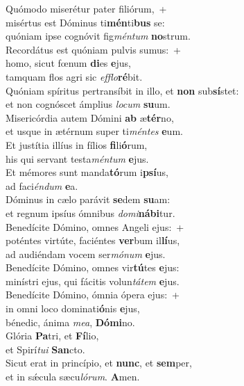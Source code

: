 \oddverse Quómodo miserétur pater filiórum,~+\\
\oddverse  misértus est Dóminus ti\textbf{mén}ti\textbf{bus} se:~\*\\
\oddverse quóniam ipse cognóvit fig\textit{mén}\textit{tum} \textbf{no}strum.\\
\evenverse Recordátus est quóniam pulvis sumus:~+\\
\evenverse  homo, sicut fœnum \textbf{di}es \textbf{e}jus,~\*\\
\evenverse tamquam flos agri sic \textit{ef}\textit{flo}\textbf{ré}bit.\\
\oddverse Quóniam spíritus pertransíbit in illo, et \textbf{non} sub\textbf{sí}stet:~\*\\
\oddverse et non cognóscet ámplius \textit{lo}\textit{cum} \textbf{su}um.\\
\evenverse Misericórdia autem Dómini \textbf{ab} æ\textbf{tér}no,~\*\\
\evenverse et usque in ætérnum super ti\textit{mén}\textit{tes} \textbf{e}um.\\
\oddverse Et justítia illíus in fílios \textbf{fi}li\textbf{ó}rum,~\*\\
\oddverse his qui servant testa\textit{mén}\textit{tum} \textbf{e}jus.\\
\evenverse Et mémores sunt manda\textbf{tó}rum i\textbf{psí}us,~\*\\
\evenverse ad faci\textit{én}\textit{dum} \textbf{e}a.\\
\oddverse Dóminus in cælo parávit \textbf{se}dem \textbf{su}am:~\*\\
\oddverse et regnum ipsíus ómnibus \textit{do}\textit{mi}\textbf{ná}\textbf{bi}tur.\\
\evenverse Benedícite Dómino, omnes Angeli ejus:~+\\
\evenverse  poténtes virtúte, faciéntes \textbf{ver}bum il\textbf{lí}us,~\*\\
\evenverse ad audiéndam vocem ser\textit{mó}\textit{num} \textbf{e}jus.\\
\oddverse Benedícite Dómino, omnes vir\textbf{tú}tes \textbf{e}jus:~\*\\
\oddverse minístri ejus, qui fácitis volun\textit{tá}\textit{tem} \textbf{e}jus.\\
\evenverse Benedícite Dómino, ómnia ópera ejus:~+\\
\evenverse  in omni loco dominati\textbf{ó}nis \textbf{e}jus,~\*\\
\evenverse bénedic, ánima \textit{me}\textit{a}, \textbf{Dó}\textbf{mi}no.\\
\oddverse Glória \textbf{Pa}tri, et \textbf{Fí}lio,~\*\\
\oddverse et Spirí\textit{tu}\textit{i} \textbf{San}cto.\\
\evenverse Sicut erat in princípio, et \textbf{nunc}, et \textbf{sem}per,~\*\\
\evenverse et in sǽcula sæcu\textit{ló}\textit{rum}. \textbf{A}men.\\
